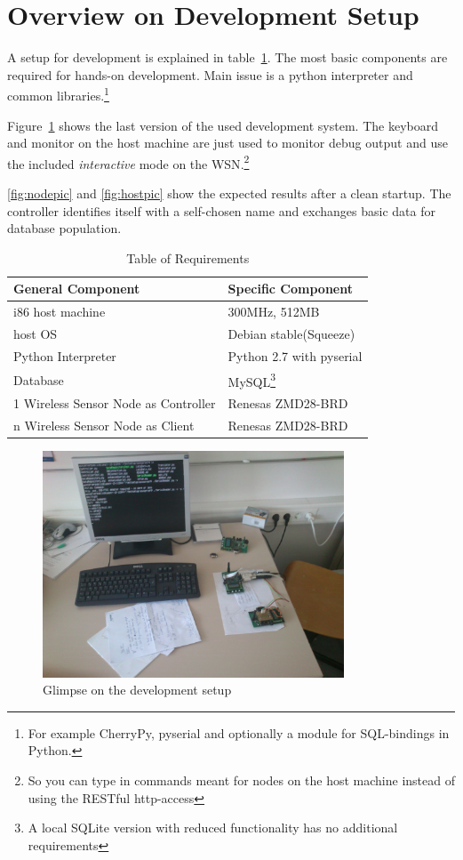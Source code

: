 \section{Overview on Development Setup}

A setup for development is explained in table~\ref{tab:requirements}. The most basic components are 
required for hands-on development. Main issue is a python interpreter and common libraries.\footnote{For example
CherryPy, pyserial and optionally a module for SQL-bindings in Python.}

Figure~\ref{setupic} shows the last version of the used development system. The keyboard and monitor on the host machine
are just used to monitor debug output and use the included \textsl{interactive} mode on the \textsc{WSN}.\footnote{So you can 
type in commands meant for nodes on the host machine instead of using the RESTful http-access}

\ref{fig:nodepic} and \ref{fig:hostpic} show the expected results after a clean startup. The controller identifies itself with a
self-chosen name and exchanges basic data for database population.
 

\begin{table}[h] 
\centering 
\begin{tabular}{|l||l|} 
General Component & Specific Component\\ 
\hline 
i86 host machine & 300MHz, 512MB\\ 
host OS & Debian stable(Squeeze) \\ 
Python Interpreter & Python 2.7 with pyserial \\ 
Database & MySQL\footnote{A local SQLite version with reduced functionality has no additional requirements} \\ 
1 Wireless Sensor Node as Controller & Renesas ZMD28-BRD \\
n Wireless Sensor Node as Client & Renesas ZMD28-BRD \\ 
\end{tabular} 
\caption{ Table of Requirements} 
\label{tab:requirements} 
\end{table}


\begin{figure}[H]
   \centering
   \includegraphics[width=0.8\textwidth]{pic/whole_setup.jpg}%
   \caption{Glimpse on the development setup}
   \label{setupic}%
\end{figure}


